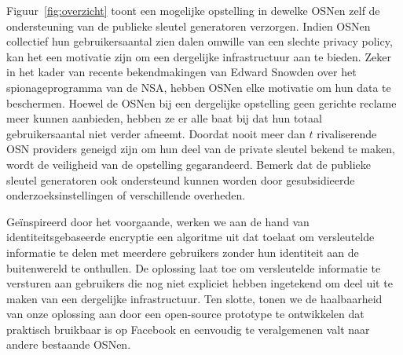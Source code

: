 Figuur~\ref{fig:overzicht} toont een mogelijke opstelling in dewelke OSNen zelf de ondersteuning van de publieke sleutel generatoren verzorgen. Indien OSNen collectief hun gebruikersaantal zien dalen omwille van een slechte privacy policy, kan het een motivatie zijn om een dergelijke infrastructuur aan te bieden. Zeker in het kader van recente bekendmakingen van Edward Snowden over het spionageprogramma van de NSA, hebben OSNen elke motivatie om hun data te beschermen. Hoewel de OSNen bij een dergelijke opstelling geen gerichte reclame meer kunnen aanbieden, hebben ze er alle baat bij dat hun totaal gebruikersaantal niet verder afneemt. Doordat nooit meer dan $t$ rivaliserende OSN providers geneigd zijn om hun deel van de private sleutel bekend te maken, wordt de veiligheid van de opstelling gegarandeerd. Bemerk dat de publieke sleutel generatoren ook ondersteund kunnen worden door gesubsidieerde onderzoeksinstellingen of verschillende overheden.

Ge{\"i}nspireerd door het voorgaande, werken we aan de hand van identiteitsgebaseerde encryptie een algoritme uit dat toelaat om versleutelde informatie te delen met meerdere gebruikers zonder hun identiteit aan de buitenwereld te onthullen. De oplossing laat toe om versleutelde informatie te versturen aan gebruikers die nog niet expliciet hebben ingetekend om deel uit te maken van een dergelijke infrastructuur. Ten slotte, tonen we de haalbaarheid van onze oplossing aan door een open-source prototype te ontwikkelen dat praktisch bruikbaar is op Facebook en eenvoudig te veralgemenen valt naar andere bestaande OSNen.


